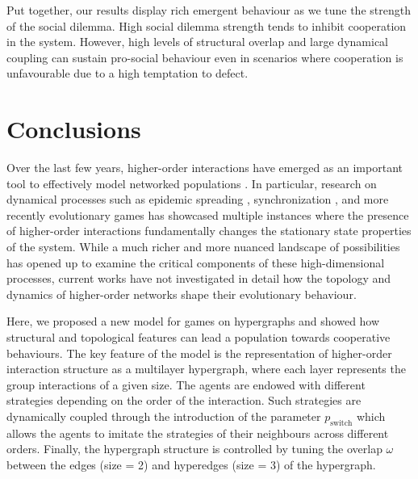 \documentclass[a4paper,pre,reqno,superscriptaddress,twocolumn, floatfix]{revtex4}
\begin{document}
Put together, our results display rich emergent behaviour as we tune the strength of the social dilemma. High social dilemma strength tends to inhibit cooperation in the system. However, high levels of structural overlap and large dynamical coupling can sustain pro-social behaviour even in scenarios where cooperation is unfavourable due to a high temptation to defect.






\section{Conclusions}\label{sec:conclusions}

Over the last few years, higher-order interactions have emerged as an important tool to effectively model networked populations \cite{grilli_higher-order_2017, battiston_networks_2020, battiston_physics_2021}. In particular, research on dynamical processes such as epidemic spreading \cite{iacopini_simplicial_2019}, synchronization \cite{gambuzza_stability_2021}, and more recently evolutionary games \cite{alvarez-rodriguez_evolutionary_2021, civilini_evolutionary_2021, guo_evolutionary_2021, civilini_explosive_2024} has showcased multiple instances where the presence of higher-order interactions fundamentally changes the stationary state properties of the system. While a much richer and more nuanced landscape of possibilities has opened up to examine the critical components of these high-dimensional processes, current works have not investigated in detail how the topology and dynamics of higher-order networks shape their evolutionary behaviour.
%


Here, we proposed a new model for games on hypergraphs and showed how structural and topological features can lead a population towards cooperative behaviours. The key feature of the model is the representation of higher-order interaction structure as a multilayer hypergraph, where each layer represents the group interactions of a given size. The agents are endowed with different strategies depending on the order of the interaction. Such strategies are dynamically coupled through the introduction of the parameter $p_{\text{switch}}$ which allows the agents to imitate the strategies of their neighbours across different orders. Finally, the hypergraph structure is controlled by tuning the overlap $\omega$ between the edges (size = 2) and hyperedges (size = 3) of the hypergraph. 
\end{document}
